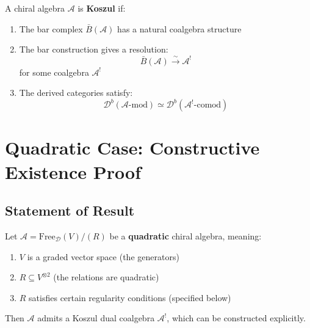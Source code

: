 \begin{definition}\label{def:koszul-property-existence}
A chiral algebra $\mathcal{A}$ is \textbf{Koszul} if:
\begin{enumerate}
\item The bar complex $\bar{B}(\mathcal{A})$ has a natural coalgebra structure
\item The bar construction gives a resolution:
      $$\bar{B}(\mathcal{A}) \xrightarrow{\sim} \mathcal{A}^!$$
      for some coalgebra $\mathcal{A}^!$
\item The derived categories satisfy:
      $$\mathcal{D}^b(\mathcal{A}\text{-mod}) \simeq \mathcal{D}^b(\mathcal{A}^!\text{-comod})$$
\end{enumerate}
\end{definition}


\section{Quadratic Case: Constructive Existence Proof}
\label{sec:quadratic-existence}

\subsection{Statement of Result}

\begin{theorem}\label{thm:quadratic-have-duals}
Let $\mathcal{A} = \text{Free}_{\mathcal{D}}(V) / (R)$ be a \textbf{quadratic} 
chiral algebra, meaning:
\begin{enumerate}
\item $V$ is a graded vector space (the generators)
\item $R \subseteq V^{\otimes 2}$ (the relations are quadratic)
\item $R$ satisfies certain regularity conditions (specified below)
\end{enumerate}

Then $\mathcal{A}$ admits a Koszul dual coalgebra $\mathcal{A}^!$, which can be 
constructed explicitly.
\end{theorem}


